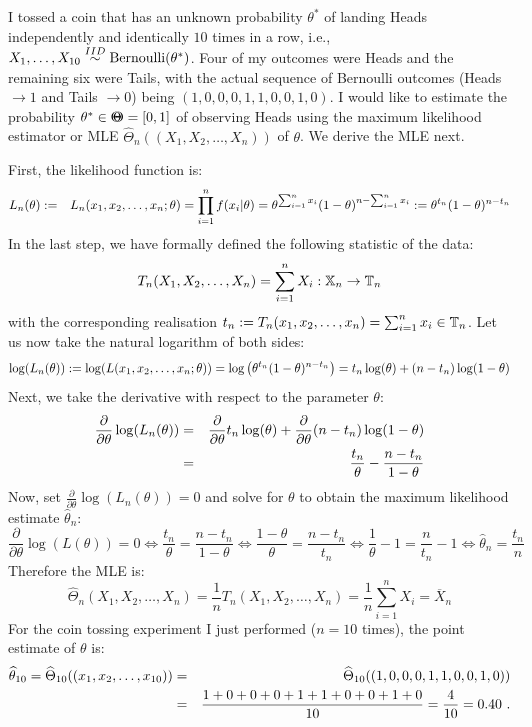 {\begin{example}\label{EX:CoinTossingML}
I tossed a coin that has an unknown probability $\theta^*$ of landing Heads independently and identically $10$ times in a row, i.e., $X_1,\ldots,X_{10} \overset{IID}{\sim} \mbox{{\rm Bernoulli}}(\theta^*)$.  Four of my outcomes were Heads and the remaining six were Tails, with the actual sequence of Bernoulli outcomes (Heads $\to 1$ and Tails $\to 0$) being $(1,0,0,0,1,1,0,0,1,0)$.  I would like to estimate the probability $\theta^* \in {\Theta}\mspace{-11 mu}{\Theta} = [0,1]$ of observing Heads using the maximum likelihood estimator or MLE $\widehat{\Theta}_n((X_1,X_2,\ldots,X_n))$ of $\theta$. We derive the MLE next.

First, the likelihood function is:
\begin{eqnarray}
L_n(\theta) &:=& L_n(x_1,x_2,\ldots,x_n; \theta)  =  \prod_{i=1}^n f(x_i|\theta) = \theta^{\sum_{i=1}^n x_i} (1-\theta)^ {n-\sum_{i=1}^n x_i} := \theta^{t_n} (1-\theta)^{n-t_n} \notag 
\end{eqnarray}
In the last step, we have formally defined the following statistic of the data: 
$$T_n(X_1,X_2,\ldots,X_n)=\sum_{i=1}^n X_i :  \mathbb{X}_n \rightarrow \mathbb{T}_n$$ with the corresponding realisation $t_n := T_n(x_1,x_2,\ldots,x_n)=\sum_{i=1}^n x_i \in \mathbb{T}_n$.  Let us now take the natural logarithm of both sides:
\begin{eqnarray}
\log(L_n(\theta)) := \log(L(x_1,x_2,\ldots,x_n; \theta))   
= \log \left( \theta^{t_n} (1-\theta)^ {n-t_n} \right) 
= t_n \log(\theta) + (n-t_n) \log(1-\theta) \notag
\end{eqnarray}
Next, we take the derivative with respect to the parameter $\theta$:
\begin{eqnarray}
\frac{\partial}{\partial \theta} \log(L_n(\theta)) 
&=& \frac{\partial}{\partial \theta}  t_n \log(\theta) + \frac{\partial}{\partial \theta}  (n-t_n) \log(1-\theta) \notag \\
&=& \frac{t_n}{\theta} - \frac{n-t_n}{1-\theta} \notag
\end{eqnarray}
Now, set $\frac{\partial}{\partial \theta} \log(L_n(\theta))=0$ and solve for $\theta$ to obtain the maximum likelihood estimate  $\widehat{\theta}_n$:
\[
\frac{\partial}{\partial \theta} \log(L(\theta)) = 0 \iff  
\frac{t_n}{\theta} = \frac{n-t_n}{1-\theta} \iff
\frac{1-\theta}{\theta} = \frac{n-t_n}{t_n} \iff
\frac{1}{\theta}-1 = \frac{n}{t_n}-1 \iff \widehat{\theta}_n = \frac{t_n}{n}
\]
Therefore the MLE is:
\[
\widehat{\Theta}_n(X_1,X_2,\ldots,X_n) = \frac{1}{n}T_n(X_1,X_2,\ldots,X_n) = \frac{1}{n} \sum_{i=1}^n X_i = \overline{X}_n
\]
For the coin tossing experiment I just performed ($n=10$ times), the point estimate of $\theta$ is:
\begin{eqnarray}
\widehat{\theta}_{10} = \widehat{\Theta}_{10}((x_1,x_2,\ldots,x_{10})) 
&=&\widehat{\Theta}_{10}((1,0,0,0,1,1,0,0,1,0)) \notag \\
&=& \frac{1+0+0+0+1+1+0+0+1+0}{10}=\frac{4}{10}=0.40 \notag \ .
\end{eqnarray}
\end{example}
}%

